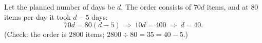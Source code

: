 Let the planned number of days be $d$. The order consists of $70d$ items, and at $80$ items per day it took $d-5$ days:
\[
70d=80(d-5)\ \Longrightarrow\ 10d=400\ \Longrightarrow\ d=\boxed{40}.
\]
(Check: the order is $2800$ items; $2800\div80=35=40-5$.)

